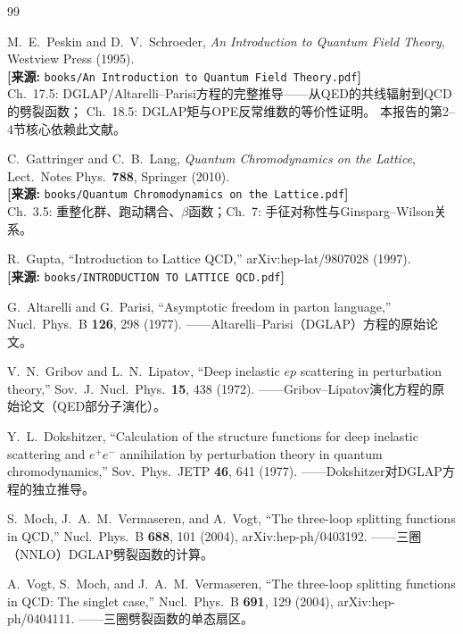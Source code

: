 \documentclass[12pt,a4paper]{ctexart}
\theoremstyle{definition}
\begin{document}
\begin{thebibliography}{99}

M.~E.~Peskin and D.~V.~Schroeder,
\textit{An Introduction to Quantum Field Theory},
Westview Press (1995).
\\\textbf{[来源:} \texttt{books/An Introduction to Quantum Field Theory.pdf}\textbf{]}
\\Ch.~17.5: DGLAP/Altarelli--Parisi方程的完整推导——从QED的共线辐射到QCD的劈裂函数；
Ch.~18.5: DGLAP矩与OPE反常维数的等价性证明。
本报告的第2--4节核心依赖此文献。

C.~Gattringer and C.~B.~Lang,
\textit{Quantum Chromodynamics on the Lattice},
Lect.\ Notes Phys.\ \textbf{788}, Springer (2010).
\\\textbf{[来源:} \texttt{books/Quantum Chromodynamics on the Lattice.pdf}\textbf{]}
\\Ch.~3.5: 重整化群、跑动耦合、$\beta$函数；Ch.~7: 手征对称性与Ginsparg--Wilson关系。

R.~Gupta,
``Introduction to Lattice QCD,''
arXiv:hep-lat/9807028 (1997).
\\\textbf{[来源:} \texttt{books/INTRODUCTION TO LATTICE QCD.pdf}\textbf{]}

G.~Altarelli and G.~Parisi,
``Asymptotic freedom in parton language,''
Nucl.\ Phys.\ B \textbf{126}, 298 (1977).
——Altarelli--Parisi（DGLAP）方程的原始论文。

V.~N.~Gribov and L.~N.~Lipatov,
``Deep inelastic $ep$ scattering in perturbation theory,''
Sov.\ J.\ Nucl.\ Phys.\ \textbf{15}, 438 (1972).
——Gribov--Lipatov演化方程的原始论文（QED部分子演化）。

Y.~L.~Dokshitzer,
``Calculation of the structure functions for deep inelastic scattering and $e^+e^-$ annihilation by perturbation theory in quantum chromodynamics,''
Sov.\ Phys.\ JETP \textbf{46}, 641 (1977).
——Dokshitzer对DGLAP方程的独立推导。

S.~Moch, J.~A.~M.~Vermaseren, and A.~Vogt,
``The three-loop splitting functions in QCD,''
Nucl.\ Phys.\ B \textbf{688}, 101 (2004), arXiv:hep-ph/0403192.
——三圈（NNLO）DGLAP劈裂函数的计算。

A.~Vogt, S.~Moch, and J.~A.~M.~Vermaseren,
``The three-loop splitting functions in QCD: The singlet case,''
Nucl.\ Phys.\ B \textbf{691}, 129 (2004), arXiv:hep-ph/0404111.
——三圈劈裂函数的单态扇区。


\end{thebibliography}
\end{document}
